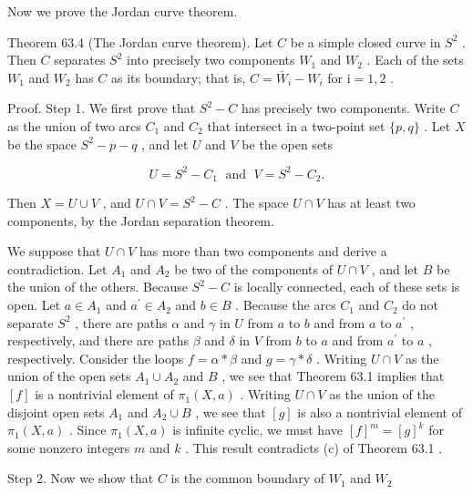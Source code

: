 Now we prove the Jordan curve theorem.

Theorem 63.4 (The Jordan curve theorem). Let \(C\) be a simple closed curve in \({S}^{2}\) . Then \(C\) separates \({S}^{2}\) into precisely two components \({W}_{1}\) and \({W}_{2}\) . Each of the sets \({W}_{1}\) and \({W}_{2}\) has \(C\) as its boundary; that is, \(C = {\bar{W}}_{i} - {W}_{i}\) for \(\mathrm{i} = 1,2\) .

Proof. Step 1. We first prove that \({S}^{2} - C\) has precisely two components. Write \(C\) as the union of two arcs \({C}_{1}\) and \({C}_{2}\) that intersect in a two-point set \(\{ p,q\}\) . Let \(X\) be the space \({S}^{2} - p - q\) , and let \(U\) and \(V\) be the open sets

\[
U = {S}^{2} - {C}_{1}\;\text{ and }\;V = {S}^{2} - {C}_{2}.
\]

Then \(X = U \cup  V\) , and \(U \cap  V = {S}^{2} - C\) . The space \(U \cap  V\) has at least two components, by the Jordan separation theorem.

We suppose that \(U \cap  V\) has more than two components and derive a contradiction. Let \({A}_{1}\) and \({A}_{2}\) be two of the components of \(U \cap  V\) , and let \(B\) be the union of the others. Because \({S}^{2} - C\) is locally connected, each of these sets is open. Let \(a \in  {A}_{1}\) and \({a}^{\prime } \in  {A}_{2}\) and \(b \in  B\) . Because the arcs \({C}_{1}\) and \({C}_{2}\) do not separate \({S}^{2}\) , there are paths \(\alpha\) and \(\gamma\) in \(U\) from \(a\) to \(b\) and from \(a\) to \({a}^{\prime }\) , respectively, and there are paths \(\beta\) and \(\delta\) in \(V\) from \(b\) to \(a\) and from \({a}^{\prime }\) to \(a\) , respectively. Consider the loops \(f = \alpha  * \beta\) and \(g = \gamma  * \delta\) . Writing \(U \cap  V\) as the union of the open sets \({A}_{1} \cup  {A}_{2}\) and \(B\) , we see that Theorem 63.1 implies that \(\left\lbrack  f\right\rbrack\) is a nontrivial element of \({\pi }_{1}\left( {X,a}\right)\) . Writing \(U \cap  V\) as the union of the disjoint open sets \({A}_{1}\) and \({A}_{2} \cup  B\) , we see that \(\left\lbrack  g\right\rbrack\) is also a nontrivial element of \({\pi }_{1}\left( {X,a}\right)\) . Since \({\pi }_{1}\left( {X,a}\right)\) is infinite cyclic, we must have \({\left\lbrack  f\right\rbrack  }^{m} = {\left\lbrack  g\right\rbrack  }^{k}\) for some nonzero integers \(m\) and \(k\) . This result contradicts (c) of Theorem 63.1 .

Step 2. Now we show that \(C\) is the common boundary of \({W}_{1}\) and \({W}_{2}\)

